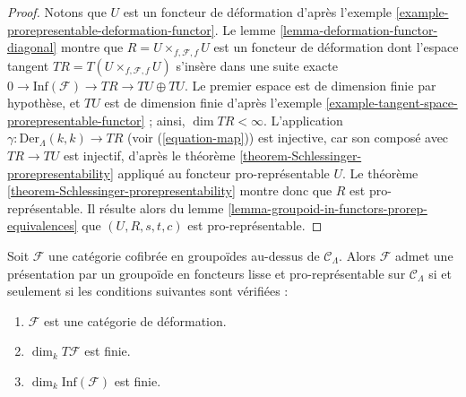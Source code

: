 \begin{proof}
Notons que $U$ est un foncteur de déformation d'après l'exemple
\ref{example-prorepresentable-deformation-functor}. Le lemme
\ref{lemma-deformation-functor-diagonal} montre que
$R = U \times_{f, \mathcal{F}, f} U$ est un foncteur de déformation dont
l'espace tangent $TR = T(U \times_{f, \mathcal{F}, f} U)$ s'insère dans une
suite exacte $0 \to \text{Inf}(\mathcal{F}) \to TR \to TU \oplus TU$. Le
premier espace est de dimension finie par hypothèse, et $TU$ est de dimension
finie d'après l'exemple
\ref{example-tangent-space-prorepresentable-functor} ; ainsi,
$\dim TR < \infty$. L'application
$\gamma : \text{Der}_\Lambda(k, k) \to TR$ (voir (\ref{equation-map})) est
injective, car son composé avec $TR \to TU$ est injectif, d'après le théorème
\ref{theorem-Schlessinger-prorepresentability} appliqué au foncteur
pro-représentable $U$. Le théorème
\ref{theorem-Schlessinger-prorepresentability} montre donc que $R$ est
pro-représentable. Il résulte alors du lemme
\ref{lemma-groupoid-in-functors-prorep-equivalences} que
$(U, R, s, t, c)$ est pro-représentable.
\end{proof}

\begin{theorem}
\label{theorem-presentation-deformation-groupoid}
Soit $\mathcal{F}$ une catégorie cofibrée en groupoïdes au-dessus de
$\mathcal{C}_\Lambda$. Alors $\mathcal{F}$ admet une présentation par un
groupoïde en foncteurs lisse et pro-représentable sur $\mathcal{C}_\Lambda$ si et
seulement si les conditions suivantes sont vérifiées :
\begin{enumerate}
\item $\mathcal{F}$ est une catégorie de déformation.
\item $\dim_k T\mathcal{F}$ est finie.
\item $\dim_k \text{Inf}(\mathcal{F})$ est finie.
\end{enumerate}
\end{theorem}

